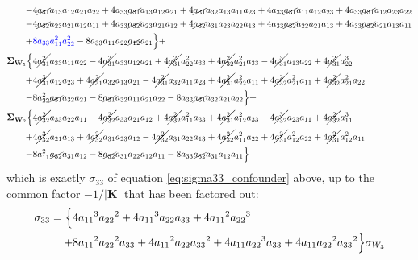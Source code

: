 \documentclass{article}
\begin{document}
\begin{equation}
\begin{aligned}
-& 4 \cancel{a_{31}} a_{13} a_{12} a_{21} a_{22} + 4 a_{33} \cancel{a_{31}} a_{13} a_{12} a_{21} + 4 \cancel{a_{31}} a_{32} a_{13} a_{11} a_{23} + 4 a_{33} \cancel{a_{31}} a_{11} a_{12} a_{23} + 4 a_{33} \cancel{a_{31}} a_{12} a_{23} a_{22} \\
-& 4 \cancel{a_{32}} a_{23} a_{21}a_{12} a_{11} + 4 a_{33} \cancel{a_{32}} a_{23} a_{21} a_{12} + 4 \cancel{a_{32}} a_{31} a_{23} a_{22} a_{13} + 4 a_{33} \cancel{a_{32}} a_{22} a_{21} a_{13} + 4 a_{33} \cancel{a_{32}} a_{21} a_{13} a_{11} \\
+& \textcolor{blue}{8 a_{33} a_{11}^{2} a_{22}^{2}} - 8 a_{33} a_{11} a_{22} \cancel{a_{12}} a_{21}\Bigr\} + \\
\mathbf{\Sigma}_{\textbf{W}_{1}} \Bigl\{& 4 \cancel{a_{31}^{2}} a_{33} a_{11} a_{22} - 4 \cancel{a_{31}^{2}} a_{33} a_{12} a_{21} + 4 \cancel{a_{31}^{2}} a_{22}^{2} a_{33} + 4 \cancel{a_{32}^{2}} a_{21}^{2} a_{33} - 4 \cancel{a_{31}^{3}} a_{13} a_{22} + 4 \cancel{a_{31}^{2}} a_{22}^{3} \\
+& 4 \cancel{a_{31}^{3}} a_{12} a_{23} + 4 \cancel{a_{31}^{2}} a_{32} a_{13} a_{21} - 4 \cancel{a_{31}^{2}} a_{32} a_{11} a_{23} + 4 \cancel{a_{31}^{2}} a_{22}^{2} a_{11} + 4 \cancel{a_{32}^{2}} a_{21}^{2} a_{11} + 4 \cancel{a_{32}^{2}} a_{21}^{2} a_{22} \\
-& 8 a_{22}^{2} \cancel{a_{31}} a_{32} a_{21} - 8 \cancel{a_{31}} a_{32} a_{11} a_{21} a_{22} - 8 a_{33} \cancel{a_{31}} a_{32} a_{21} a_{22}\Bigr\} + \\
\mathbf{\Sigma}_{\textbf{W}_{2}} \Bigl\{& 4 \cancel{a_{32}^{2}} a_{33} a_{22} a_{11} - 4 \cancel{a_{32}^{2}} a_{33} a_{21} a_{12} + 4 \cancel{a_{32}^{2}} a_{11}^{2} a_{33} + 4 \cancel{a_{31}^{2}} a_{12}^{2} a_{33} - 4 \cancel{a_{32}^{3}} a_{23} a_{11} + 4 \cancel{a_{32}^{2}} a_{11}^{3} \\
+& 4 \cancel{a_{32}^{3}} a_{21} a_{13} + 4 \cancel{a_{32}^{2}} a_{31} a_{23} a_{12} - 4 \cancel{a_{32}^{2}} a_{31} a_{22} a_{13} + 4 \cancel{a_{32}^{2}} a_{11}^{2} a_{22} + 4 \cancel{a_{31}^{2}} a_{12}^{2} a_{22} + 4 \cancel{a_{31}^{2}} a_{12}^{2} a_{11} \\
-& 8 a_{11}^{2} \cancel{a_{32}} a_{31} a_{12} - 8 \cancel{a_{32}} a_{31} a_{22} a_{12} a_{11} - 8 a_{33} \cancel{a_{32}} a_{31} a_{12} a_{11}\Bigr\}
\end{aligned}
\end{equation}
which is exactly $\sigma_{33}$ of equation \ref{eq:sigma33_confounder} above, up to the common factor $-1/|\mathbf{K}|$ that has been factored out:
\begin{align*}
\sigma_{33}= \Bigl\{ & 4{a_{11}}^3{a_{22}}^2+4{a_{11}}^3a_{22}a_{33}+4{a_{11}}^2{a_{22}}^3 \\
+&8{a_{11}}^2{a_{22}}^2a_{33}+4{a_{11}}^2a_{22}{a_{33}}^2+4a_{11}{a_{22}}^3a_{33}+4a_{11}{a_{22}}^2{a_{33}}^2 \Bigr\} \sigma_{W_{3}}
\end{align*}
\end{document}

